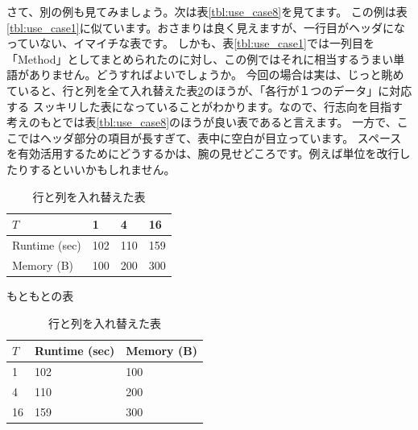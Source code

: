 \documentclass[uplatex,onecolumn,9pt,dvipdfmx]{jsarticle}
\newcommand{\Tref}[1]{表\ref{#1}}
\begin{document}
さて、別の例も見てみましょう。次は\Tref{tbl:use_case8}を見てます。
この例は\Tref{tbl:use_case1}に似ています。おさまりは良く見えますが、一行目がヘッダになっていない、イマイチな表です。
しかも、\Tref{tbl:use_case1}では一列目を「Method」としてまとめられたのに対し、この例ではそれに相当するうまい単語がありません。どうすればよいでしょうか。
今回の場合は実は、じっと眺めていると、行と列を全て入れ替えた\Tref{tbl:use_case9}のほうが、「各行が１つのデータ」に対応する
スッキリした表になっていることがわかります。なので、行志向を目指す考えのもとでは\Tref{tbl:use_case8}のほうが良い表であると言えます。
一方で、ここではヘッダ部分の項目が長すぎて、表中に空白が目立っています。
スペースを有効活用するためにどうするかは、腕の見せどころです。例えば単位を改行したりするといいかもしれません。

\begin{table}[h]
    \begin{minipage}{0.48\linewidth}
        \centering
        \begin{tabular}{@{}llll@{}} \toprule
            $T$ & 1 & 4 & 16 \\ \midrule
            Runtime (sec)       & 102 & 110 & 159 \\ 
            Memory (B)  & 100 & 200 & 300 \\ \bottomrule   
        \end{tabular}
        \caption{もともとの表}
        \label{tbl:use_case8}
    \end{minipage}
    \hfill
    \begin{minipage}{0.48\linewidth}
        \centering
        \begin{tabular}{@{}lll@{}} \toprule
            $T$ & Runtime (sec) & Memory (B) \\ \midrule 
            1 & 102 & 100 \\
            4 & 110 & 200 \\
            16 & 159 & 300 \\ \bottomrule 
        \end{tabular}
        \caption{行と列を入れ替えた表}
        \label{tbl:use_case9}
    \end{minipage}
\end{table}
\end{document}
